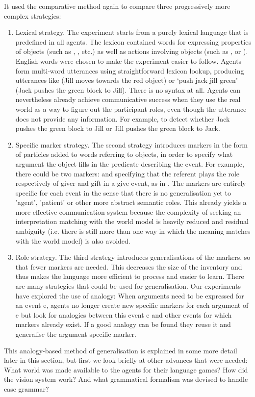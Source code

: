 It used the comparative method again to compare three progressively more complex strategies: 
\begin{enumerate}
\item {\bfshape  Lexical strategy}. The experiment starts from a purely 
lexical language that is predefined in all agents. The lexicon contained words for expressing properties of 
objects (such as , , etc.)
as well as actions involving objects (such as ,  or ). English words
were chosen to make the experiment easier to follow. Agents form
multi-word utterances using straightforward lexicon lookup, producing utterances
like  (Jill moves towards the red object) or `push 
jack jill green' (Jack pushes the green block to Jill). There is no syntax at all. Agents can nevertheless already 
achieve communicative success when they use the real world as a way to figure out the participant roles, even though the 
utterance does not provide any information. For example, to detect whether Jack pushes the green block to Jill or Jill 
pushes the green block to Jack. 

\item {\bfshape  Specific marker strategy}. The second strategy introduces markers in the form of particles added to words referring 
to objects, in order to specify what argument the object fills in the predicate describing the 
event. For example, there could be two markers:  
and  specifying that the referent plays the role respectively of giver and gift in a give event, as in
. The markers are entirely specific for each event in the sense that there is no generalisation 
yet to 'agent', 'patient' or other more abstract semantic roles. This already yields a more effective 
communication system because the complexity of seeking an interpretation matching with the world model is heavily
reduced and residual ambiguity (i.e. there is still more than one way in which the 
meaning matches with the world model) is also avoided. 

\item {\bfshape  Role strategy}. The third strategy introduces generalisations of the markers, so that 
fewer markers are needed. This decreases the size of the inventory and thus makes the language more efficient to 
process and easier to learn. There are many strategies that could be used for generalisation. Our experiments 
have explored the use of analogy: When arguments 
need to be expressed for an event e, agents no longer create new specific markers for each argument of e
but look for analogies between this event e and other events for which markers already exist. If a good analogy 
can be found they reuse it and generalise the argument-specific marker. 
\end{enumerate}
This analogy-based method of generalisation is explained in some more detail later in this section, but first 
we look briefly at other advances that were needed: What world was made available to the agents for their 
language games? How did the vision system work? And what grammatical formalism was devised to handle case grammar? 


